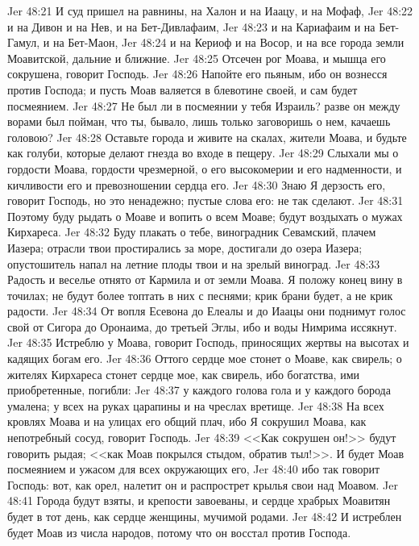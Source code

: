 \vs Jer 48:21 И суд пришел на равнины, на Халон и на Иаацу, и на Мофаф,
\vs Jer 48:22 и на Дивон и на Нев, и на Бет-Дивлафаим,
\vs Jer 48:23 и на Кариафаим и на Бет-Гамул, и на Бет-Маон,
\vs Jer 48:24 и на Кериоф и на Восор, и на все города земли Моавитской, дальние и ближние.
\vs Jer 48:25 Отсечен рог Моава, и мышца его сокрушена, говорит Господь.
\vs Jer 48:26 Напойте его пьяным, ибо он вознесся против Господа; и пусть Моав валяется в блевотине своей, и сам будет посмеянием.
\vs Jer 48:27 Не был ли в посмеянии у тебя Израиль? разве он между ворами был пойман, что ты, бывало, лишь только заговоришь о нем, качаешь головою?
\vs Jer 48:28 Оставьте города и живите на скалах, жители Моава, и будьте как голуби, которые делают гнезда во входе в пещеру.
\vs Jer 48:29 Слыхали мы о гордости Моава, гордости чрезмерной, о его высокомерии и его надменности, и кичливости его и превозношении сердца его.
\vs Jer 48:30 Знаю Я дерзость его, говорит Господь, но это ненадежно; пустые слова его: не так сделают.
\vs Jer 48:31 Поэтому буду рыдать о Моаве и вопить о всем Моаве; будут воздыхать о мужах Кирхареса.
\vs Jer 48:32 Буду плакать о тебе, виноградник Севамский, плачем Иазера; отрасли твои простирались за море, достигали до озера Иазера; опустошитель напал на летние плоды твои и на зрелый виноград.
\vs Jer 48:33 Радость и веселье отнято от Кармила и от земли Моава. Я положу конец вину в точилах; не будут более топтать в них с песнями; крик брани будет, а не крик радости.
\vs Jer 48:34 От вопля Есевона до Елеалы и до Иаацы они поднимут голос свой от Сигора до Оронаима, до третьей Эглы, ибо и воды Нимрима иссякнут.
\vs Jer 48:35 Истреблю у Моава, говорит Господь, приносящих жертвы на высотах и кадящих богам его.
\vs Jer 48:36 Оттого сердце мое стонет о Моаве, как свирель; о жителях Кирхареса стонет сердце мое, как свирель, ибо богатства, ими приобретенные, погибли:
\vs Jer 48:37 у каждого голова гола и у каждого борода умалена; у всех на руках царапины и на чреслах вретище.
\vs Jer 48:38 На всех кровлях Моава и на улицах его общий плач, ибо Я сокрушил Моава, как непотребный сосуд, говорит Господь.
\vs Jer 48:39 <<Как сокрушен он!>> будут говорить рыдая; <<как Моав покрылся стыдом, обратив тыл!>>. И будет Моав посмеянием и ужасом для всех окружающих его,
\vs Jer 48:40 ибо так говорит Господь: вот, как орел, налетит он и распрострет крылья свои над Моавом.
\vs Jer 48:41 Города будут взяты, и крепости завоеваны, и сердце храбрых Моавитян будет в тот день, как сердце женщины, мучимой родами.
\vs Jer 48:42 И истреблен будет Моав из числа народов, потому что он восстал против Господа.
